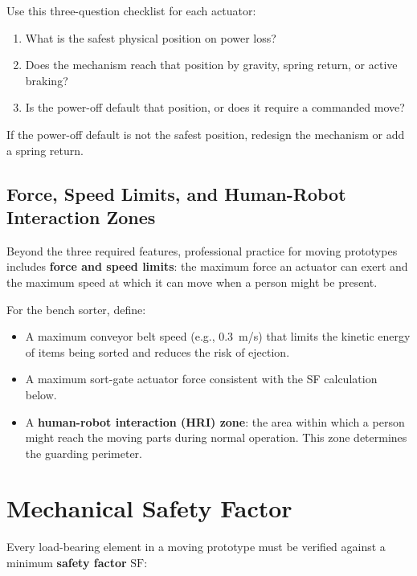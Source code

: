 Use this three-question checklist for each actuator:
\begin{enumerate}
  \item What is the safest physical position on power loss?
  \item Does the mechanism reach that position by gravity, spring return, or
        active braking?
  \item Is the power-off default that position, or does it require a commanded
        move?
\end{enumerate}

If the power-off default is not the safest position, redesign the mechanism or
add a spring return.

\subsection{Force, Speed Limits, and Human-Robot Interaction Zones}
\label{sec:ch9-robot-hri}

Beyond the three required features, professional practice for moving prototypes
includes \textbf{force and speed limits}:
the maximum force an actuator can exert and the maximum speed at which it can
move when a person might be present.

For the bench sorter, define:
\begin{itemize}
  \item A maximum conveyor belt speed (e.g., 0.3~m/s) that limits the kinetic
        energy of items being sorted and reduces the risk of ejection.
  \item A maximum sort-gate actuator force consistent with the SF calculation
        below.
  \item A \textbf{human-robot interaction (HRI) zone}:
        the area within which a person might reach the moving parts during normal
        operation.
        This zone determines the guarding perimeter.
\end{itemize}

\section{Mechanical Safety Factor}
\label{sec:ch9-sf}

Every load-bearing element in a moving prototype must be verified against a
minimum \textbf{safety factor} $\mathrm{SF}$:

